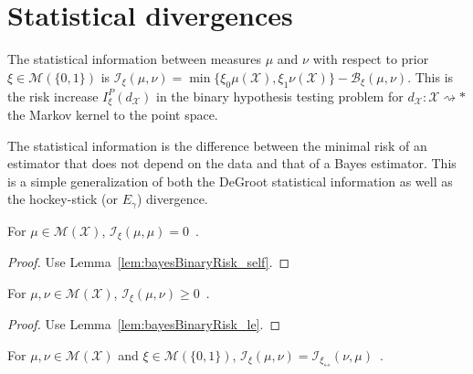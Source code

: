\section{Statistical divergences}

\begin{definition}
  \label{def:statInfo}
  The statistical information between measures $\mu$ and $\nu$ with respect to prior $\xi \in \mathcal M(\{0,1\})$ is
  $\mathcal I_\xi(\mu, \nu) = \min\{\xi_0 \mu(\mathcal X), \xi_1 \nu(\mathcal X)\} - \mathcal B_\xi(\mu, \nu)$.
  This is the risk increase $I_\xi^P(d_{\mathcal X})$ in the binary hypothesis testing problem for $d_{\mathcal X} : \mathcal X \rightsquigarrow *$ the Markov kernel to the point space.
\end{definition}

The statistical information is the difference between the minimal risk of an estimator that does not depend on the data and that of a Bayes estimator.
This is a simple generalization of both the DeGroot statistical information as well as the hockey-stick (or $E_\gamma$) divergence.

\begin{lemma}
  \label{lem:statInfo_self}
  For $\mu \in \mathcal M(\mathcal X)$, $\mathcal I_\xi(\mu, \mu) = 0$~.
\end{lemma}

\begin{proof}%
{}
Use Lemma~\ref{lem:bayesBinaryRisk_self}.
\end{proof}

\begin{lemma}
  \label{lem:statInfo_nonneg}
  For $\mu, \nu \in \mathcal M(\mathcal X)$, $\mathcal I_\xi(\mu, \nu) \ge 0$~.
\end{lemma}

\begin{proof}%
{}
Use Lemma~\ref{lem:bayesBinaryRisk_le}.
\end{proof}

\begin{lemma}
  \label{lem:statInfo_symm}
  For $\mu, \nu \in \mathcal M(\mathcal X)$ and $\xi \in \mathcal M(\{0,1\})$, $\mathcal I_\xi(\mu, \nu) = \mathcal I_{\xi_\leftrightarrow}(\nu, \mu)$~.
\end{lemma}

